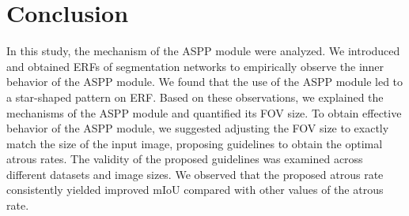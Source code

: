 \documentclass{article}
\begin{document}
\section{Conclusion}
\label{sec:con}
In this study, the mechanism of the ASPP module were analyzed. We introduced and obtained ERFs of segmentation networks to empirically observe the inner behavior of the ASPP module. We found that the use of the ASPP module led to a star-shaped pattern on ERF. Based on these observations, we explained the mechanisms of the ASPP module and quantified its FOV size. To obtain effective behavior of the ASPP module, we suggested adjusting the FOV size to exactly match the size of the input image, proposing guidelines to obtain the optimal atrous rates. The validity of the proposed guidelines was examined across different datasets and image sizes. We observed that the proposed atrous rate consistently yielded improved mIoU compared with other values of the atrous rate.








\end{document}
